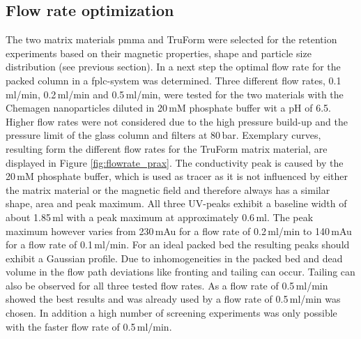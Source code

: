 % 
% 
% 


\subsection{Flow rate optimization}
\label{subsec:flow_rate_res}

The two matrix materials \gls{pmma} and TruForm were selected for the retention experiments based on their magnetic properties, shape and particle size distribution (see previous section). In a next step the optimal flow rate for the packed column in a \gls{fplc}-system was determined. Three different flow rates, 0.1\,ml/min, 0.2\,ml/min and 0.5\,ml/min, were tested for the two materials with the Chemagen nanoparticles diluted in 20\,mM phosphate buffer wit a pH of 6.5. Higher flow rates were not considered due to the high pressure build-up and the pressure limit of the glass column and filters at 80\,bar. Exemplary curves, resulting form the different flow rates for the TruForm matrix material, are displayed in Figure \ref{fig:flowrate_prax}. The conductivity peak is caused by the 20\,mM phosphate buffer, which is used as tracer as it is not influenced by either the matrix material or the magnetic field and therefore always has a similar shape, area and peak maximum. All three UV-peaks exhibit a baseline width of about 1.85\,ml with a peak maximum at approximately 0.6\,ml. The peak maximum however varies from 230\,mAu for a flow rate of 0.2\,ml/min to 140\,mAu for a flow rate of 0.1\,ml/min. 
For an ideal packed bed the resulting peaks should exhibit a Gaussian profile. Due to inhomogeneities in the packed bed and dead volume in the flow path deviations like fronting and tailing can occur. Tailing can also be observed for all three tested flow rates. As a flow rate of 0.5\,ml/min showed the best results and was already used by \cite{AndreMaster} a flow rate of 0.5\,ml/min was chosen. In addition a high number of screening experiments was only possible with the faster flow rate of 0.5\,ml/min.       

